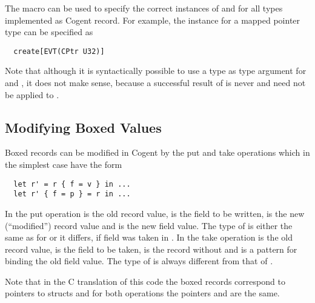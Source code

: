 The macro can be used to specify the correct
instances of  and  for all types implemented as Cogent record. For example, the 
 instance for a mapped pointer type  can be specified as
\begin{verbatim}
  create[EVT(CPtr U32)]
\end{verbatim}

Note that although it is syntactically possible to use a type  as type argument for 
and , it does not make sense, because a successful result of  is never  and
 need not be applied to .

\subsection{Modifying Boxed Values}
\label{design-operations-modify}

Boxed records can be modified in Cogent by the put and take operations which in the simplest case have the form
\begin{verbatim}
  let r' = r { f = v } in ...
  let r' { f = p } = r in ...
\end{verbatim}
In the put operation  is the old record value,  is the field to be written,  is the 
new (``modified'') record value and  is the new field value. The type of  is either the same as 
for  or it differs, if field  was taken in . In the take operation  is the old record value,  
is the field to be taken,  is the record without  and  is a pattern for binding the old 
field value. The type of  is always different from that of .

Note that in the C translation of this code the boxed records correspond to pointers to structs and for both operations
the pointers  and  are the same.

